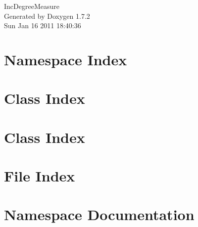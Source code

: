 \documentclass[a4paper]{book}
\begin{document}
\hypersetup{pageanchor=false}
\begin{titlepage}
\vspace*{7cm}
\begin{center}
{\Large IncDegreeMeasure }\\
\vspace*{1cm}
{\large Generated by Doxygen 1.7.2}\\
\vspace*{0.5cm}
{\small Sun Jan 16 2011 18:40:36}\\
\end{center}
\end{titlepage}
\clearemptydoublepage
{}
\tableofcontents
\clearemptydoublepage
{}
\hypersetup{pageanchor=true}
\chapter{Namespace Index}

\chapter{Class Index}

\chapter{Class Index}

\chapter{File Index}

\chapter{Namespace Documentation}









\end{document}
